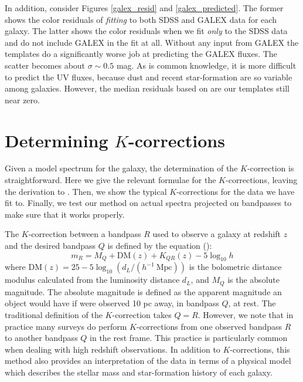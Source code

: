 \documentclass[10pt,preprint]{aastex}
\begin{document}
In addition, consider Figures \ref{galex_resid} and
\ref{galex_predicted}. The former shows the color residuals of {\it
fitting} to both SDSS and GALEX data for each galaxy. The latter shows
the color residuals when we fit {\it only} to the SDSS data and do not
include GALEX in the fit at all. Without any input from GALEX the
templates do a significantly worse job at predicting the GALEX
fluxes. The scatter becomes about $\sigma \sim 0.5$ mag.  As is common
knowledge, it is more difficult to predict the UV fluxes, because dust
and recent star-formation are so variable among galaxies. However, the
median residuals based on are our templates still near zero.

\section{Determining $K$-corrections}
\label{kcorrect}

Given a model spectrum for the galaxy, the determination of the
$K$-correction is straightforward. Here we give the relevant formulae
for the $K$-corrections, leaving the derivation to \citet{hogg02a}.
Then, we show the typical $K$-corrections for the data we have fit
to. Finally, we test our method on actual spectra projected on
bandpasses to make sure that it works properly.

The $K$-correction between a bandpass $R$ used to observe a galaxy at
redshift $z$ and the desired bandpass $Q$ is defined by the equation
(\citealt{oke68a, hogg02a}):
\begin{equation}
\label{kcorrecteqn}
m_R = M_Q + \mathrm{DM}(z) + K_{QR}(z) - 5 \log_{10} h 
\end{equation}
where $\mathrm{DM}(z) = 25 - 5\log_{10} (d_L /
(h^{-1}{\mathrm{~Mpc}}))$ is the bolometric distance modulus
calculated from the luminosity distance $d_L$, and $M_Q$ is the
absolute magnitude. The absolute magnitude is defined as the apparent
magnitude an object would have if were observed 10 pc away, in
bandpass $Q$, at rest.  The traditional definition of the
$K$-correction takes $Q=R$. However, we note that in practice many
surveys do perform $K$-corrections from one observed bandpass $R$ to
another bandpass $Q$ in the rest frame. This practice is particularly
common when dealing with high redshift observations.  In addition to
$K$-corrections, this method also provides an interpretation of the
data in terms of a physical model which describes the stellar mass and
star-formation history of each galaxy.
\end{document}

